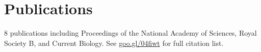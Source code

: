 \documentclass[]{Finlay_Maguire_CV}
\begin{document}
\begin{minipage}[t]{0.66\textwidth}
\sectionsep


\section{Publications} 
%
%
8 publications including Proceedings of the National Academy of Sciences, Royal Society B, and Current Biology.
See \url{goo.gl/04fiwt} for full citation list.

\end{minipage}
\end{document}
